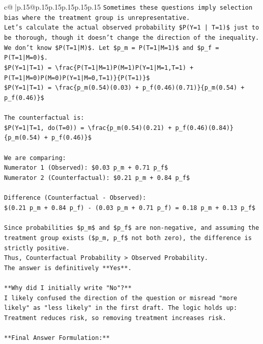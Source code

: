 \documentclass{article}
\begin{document}
{\begin{supertabular}{c@{$\;$}|p{.15\linewidth}@{}p{.15\linewidth}p{.15\linewidth}p{.15\linewidth}p{.15\linewidth}p{.15\linewidth}}
{{{\texttt{Sometimes these questions imply selection bias where the treatment group is unrepresentative.} \\
\texttt{Let's calculate the actual observed probability \$P(Y=1 | T=1)\$ just to be thorough, though it doesn't change the direction of the inequality.} \\
\texttt{We don't know \$P(T=1|M)\$. Let \$p\_m = P(T=1|M=1)\$ and \$p\_f = P(T=1|M=0)\$.} \\
\texttt{\$P(Y=1|T=1) = \textbackslash{}frac\{P(T=1|M=1)P(M=1)P(Y=1|M=1,T=1) + P(T=1|M=0)P(M=0)P(Y=1|M=0,T=1)\}\{P(T=1)\}\$} \\
\texttt{\$P(Y=1|T=1) = \textbackslash{}frac\{p\_m(0.54)(0.03) + p\_f(0.46)(0.71)\}\{p\_m(0.54) + p\_f(0.46)\}\$} \\
\\ 
\texttt{The counterfactual is:} \\
\texttt{\$P(Y=1|T=1, do(T=0)) = \textbackslash{}frac\{p\_m(0.54)(0.21) + p\_f(0.46)(0.84)\}\{p\_m(0.54) + p\_f(0.46)\}\$} \\
\\ 
\texttt{We are comparing:} \\
\texttt{Numerator 1 (Observed): \$0.03 p\_m + 0.71 p\_f\$} \\
\texttt{Numerator 2 (Counterfactual): \$0.21 p\_m + 0.84 p\_f\$} \\
\\ 
\texttt{Difference (Counterfactual {-} Observed):} \\
\texttt{\$(0.21 p\_m + 0.84 p\_f) {-} (0.03 p\_m + 0.71 p\_f) = 0.18 p\_m + 0.13 p\_f\$} \\
\\ 
\texttt{Since probabilities \$p\_m\$ and \$p\_f\$ are non{-}negative, and assuming the treatment group exists (\$p\_m, p\_f\$ not both zero), the difference is strictly positive.} \\
\texttt{Thus, Counterfactual Probability > Observed Probability.} \\
\texttt{The answer is definitively **Yes**.} \\
\\ 
\texttt{**Why did I initially write "No"?**} \\
\texttt{I likely confused the direction of the question or misread "more likely" as "less likely" in the first draft. The logic holds up: Treatment reduces risk, so removing treatment increases risk.} \\
\\ 
\texttt{**Final Answer Formulation:**} \\
}}}
\end{supertabular}}
\end{document}
